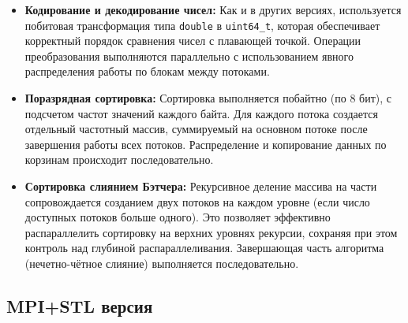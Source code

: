 \documentclass[12pt]{article}
\begin{document}
\begin{itemize}
  \item \textbf{Кодирование и декодирование чисел:}  
  Как и в других версиях, используется побитовая трансформация типа \texttt{double} в \texttt{uint64\_t}, которая обеспечивает корректный порядок сравнения чисел с плавающей точкой. Операции преобразования выполняются параллельно с использованием явного распределения работы по блокам между потоками.

  \item \textbf{Поразрядная сортировка:}  
  Сортировка выполняется побайтно (по 8 бит), с подсчетом частот значений каждого байта. Для каждого потока создается отдельный частотный массив, суммируемый на основном потоке после завершения работы всех потоков. Распределение и копирование данных по корзинам происходит последовательно.

  \item \textbf{Сортировка слиянием Бэтчера:}  
  Рекурсивное деление массива на части сопровождается созданием двух потоков на каждом уровне (если число доступных потоков больше одного). Это позволяет эффективно распараллелить сортировку на верхних уровнях рекурсии, сохраняя при этом контроль над глубиной распараллеливания. Завершающая часть алгоритма (нечетно-чётное слияние) выполняется последовательно.
\end{itemize}

\subsection{MPI+STL версия}
\end{document}
